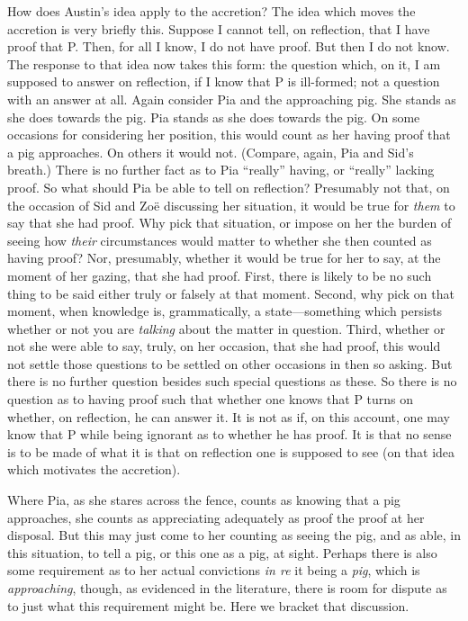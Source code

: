 How does Austin's idea apply to the accretion? The idea which moves the accretion is very briefly this. Suppose I cannot tell, on reflection, that I have proof that P. Then, for all I know, I do not have proof. But then I do not know. The response to that idea now takes this form: the question which, on it, I am supposed to answer on reflection, if I know that P is ill-formed; not a question with an answer at all. Again consider Pia and the approaching pig. She stands as she does towards the pig. Pia stands as she does towards the pig. On some occasions for considering her position, this would count as her having proof that a pig approaches. On others it would not. (Compare, again, Pia and Sid's breath.) There is no further fact as to Pia ``really'' having, or ``really'' lacking proof. So what should Pia be able to tell on reflection? Presumably not that, on the occasion of Sid and Zoë discussing her situation, it would be true for \emph{them} to say that she had proof. Why pick that situation, or impose on her the burden of seeing how \emph{their} circumstances would matter to whether she then counted as having proof? Nor, presumably, whether it would be true for her to say, at the moment of her gazing, that she had proof. First, there is likely to be no such thing to be said either truly or falsely at that moment. Second, why pick on that moment, when knowledge is, grammatically, a state---something which persists whether or not you are \emph{talking} about the matter in question. Third, whether or not she were able to say, truly, on her occasion, that she had proof, this would not settle those questions to be settled on other occasions in then so asking. But there is no further question besides such special questions as these. So there is no question as to having proof such that whether one knows that P turns on whether, on reflection, he can answer it. It is not as if, on this account, one may know that P while being ignorant as to whether he has proof. It is that no sense is to be made of what it is that on reflection one is supposed to see (on that idea which motivates the accretion).

Where Pia, as she stares across the fence, counts as knowing that a pig approaches, she counts as appreciating adequately as proof the proof at her disposal. But this may just come to her counting as seeing the pig, and as able, in this situation, to tell a pig, or this one as a pig, at sight. Perhaps there is also some requirement as to her actual convictions \emph{in re} it being a \emph{pig}, which is \emph{approaching}, though, as evidenced in the literature, there is room for dispute as to just what this requirement might be. Here we bracket that discussion.

